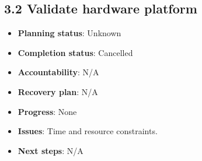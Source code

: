 \subsection*{3.2 Validate hardware platform}
\begin{itemize}
    \item \textbf{Planning status}: Unknown
    \item \textbf{Completion status}: Cancelled 
    \item \textbf{Accountability}: N/A
    \item \textbf{Recovery plan}: N/A
    \item \textbf{Progress}: None
    \item \textbf{Issues}: Time and resource constraints.
    \item \textbf{Next steps}: N/A
\end{itemize}



\begin{comment}

\end{comment}

